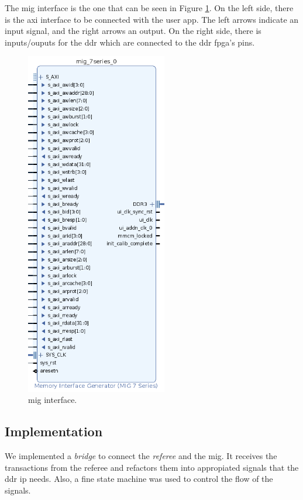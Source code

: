 The \gls{mig} interface is the one that can be seen in Figure \ref{fig:mig}.
On the left side, there is the \gls{axi} interface to be connected with the user app. The left arrows indicate an input signal, and the right arrows an output.
On the right side, there is inputs/ouputs for the \gls{ddr} which are connected to the \gls{ddr} \gls{fpga}'s pins.

\begin{figure}
    \centering
    \includegraphics[width=0.55\textwidth]{img/mig_interface.png}
    \caption{\gls{mig} interface.}
    \label{fig:mig}
\end{figure}

\subsection{Implementation}
We implemented a \textit{bridge} to connect the \textit{referee} and the \gls{mig}.
It receives the transactions from the referee and refactors them into appropiated signals that the \gls{ddr} \gls{ip} needs. Also, a fine state machine was used to control the flow of the signals.


